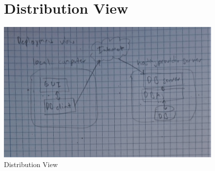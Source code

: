 \begin{figure}[hbt]
\section{Distribution View}
  \includegraphics[width=\textwidth]{Immagini/IMG_20230604_171821.jpg}
  \caption{Distribution View}
\end{figure}
